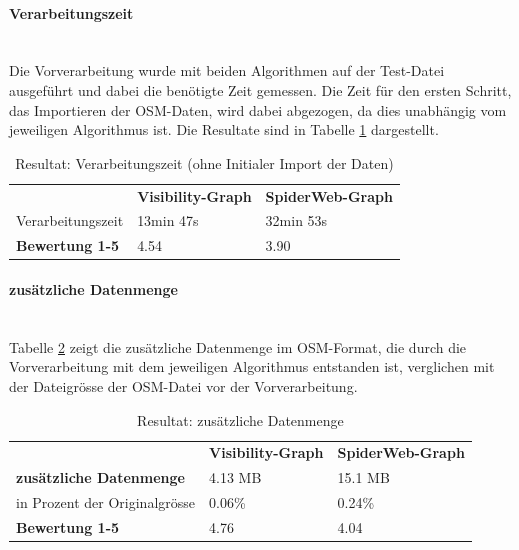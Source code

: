 \paragraph{Verarbeitungszeit}\label{result:Verarbeitungszeit}~\\
Die Vorverarbeitung wurde mit beiden Algorithmen auf der Test-Datei ausgeführt und dabei die benötigte Zeit gemessen. Die Zeit für den ersten Schritt, das Importieren der \ac{OSM}-Daten, wird dabei abgezogen, da dies unabhängig vom jeweiligen Algorithmus ist. Die Resultate sind in Tabelle \ref{Resultat: Verarbeitungszeit} dargestellt.

\begin{table}[H]
    \centering
    \caption{Resultat: Verarbeitungszeit (ohne Initialer Import der Daten)}
    \label{Resultat: Verarbeitungszeit}
    \begin{tabular}{lll}
        & \textbf{Visibility-Graph} & \textbf{SpiderWeb-Graph}     \\
        Verarbeitungszeit  &        13min 47s                   & 32min 53s    \\
        \textbf{Bewertung 1-5} &    4.54                     &  3.90
    \end{tabular}
\end{table}


\paragraph{zusätzliche Datenmenge}\label{result:zusätzliche Datenmenge}~\\
Tabelle \ref{table: zusätzliche Datenmenge} zeigt die zusätzliche Datenmenge im \ac{OSM}-Format, die durch die Vorverarbeitung mit dem jeweiligen Algorithmus entstanden ist, verglichen mit der Dateigrösse der \ac{OSM}-Datei vor der Vorverarbeitung.

\begin{table}[H]
    \centering
    \caption{Resultat: zusätzliche Datenmenge}
    \label{table: zusätzliche Datenmenge}
    \begin{tabular}{lll}
        & \textbf{Visibility-Graph} & \textbf{SpiderWeb-Graph} \\
        \textbf{zusätzliche Datenmenge} & 4.13 MB                    & 15.1 MB  \\  
        in Prozent der Originalgrösse   & 0.06\%                     & 0.24\%   \\
        \textbf{Bewertung 1-5}          & 4.76                       & 4.04
    \end{tabular}
\end{table}

